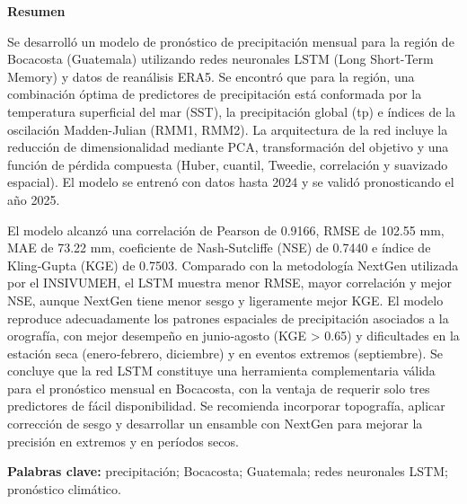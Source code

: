 \documentclass[11pt,letterpaper,oneside]{report}
\begin{document}
\begin{titlepage}
\begin{center}
\begin{minipage}{0.82\textwidth}
\begin{center}
\textbf{Resumen}
\end{center}
Se desarrolló un modelo de pronóstico de precipitación mensual para la región de Bocacosta (Guatemala) utilizando redes neuronales LSTM (Long Short-Term Memory) y datos de reanálisis ERA5. Se encontró que para la región, una combinación óptima de predictores de precipitación está conformada por la temperatura superficial del mar (SST), la precipitación global (tp) e índices de la oscilación Madden-Julian (RMM1, RMM2). La arquitectura de la red incluye la reducción de dimensionalidad mediante PCA, transformación del objetivo y una función de pérdida compuesta (Huber, cuantil, Tweedie, correlación y suavizado espacial). El modelo se entrenó con datos hasta 2024 y se validó pronosticando el año 2025.

El modelo alcanzó una correlación de Pearson de 0.9166, RMSE de 102.55 mm, MAE de 73.22 mm, coeficiente de Nash‑Sutcliffe (NSE) de 0.7440 e índice de Kling‑Gupta (KGE) de 0.7503. Comparado con la metodología NextGen utilizada por el INSIVUMEH, el LSTM muestra menor RMSE, mayor correlación y mejor NSE, aunque NextGen tiene menor sesgo y ligeramente mejor KGE. El modelo reproduce adecuadamente los patrones espaciales de precipitación asociados a la orografía, con mejor desempeño en junio‑agosto (KGE > 0.65) y dificultades en la estación seca (enero‑febrero, diciembre) y en eventos extremos (septiembre). Se concluye que la red LSTM constituye una herramienta complementaria válida para el pronóstico mensual en Bocacosta, con la ventaja de requerir solo tres predictores de fácil disponibilidad. Se recomienda incorporar topografía, aplicar corrección de sesgo y desarrollar un ensamble con NextGen para mejorar la precisión en extremos y en períodos secos.
\vspace{1em}

\noindent\textbf{Palabras clave:} precipitación; Bocacosta; Guatemala; redes neuronales LSTM; pronóstico climático.
\end{minipage}
\end{center}

\end{titlepage}

\setcounter{page}{1}
\end{document}

